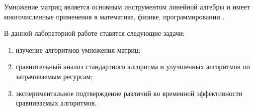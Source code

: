 \newpage
{}

Умножение матриц является основным инструментом линейной алгебры и имеет
многочисленные применения в математике, физике, программировании \cite{haskell}.

В данной лабораторной работе ставятся следующие задачи:

\begin{enumerate}
    \item изучение алгоритмов умножения матриц;
    \item сравнительный анализ стандартного алгоритма и улучшенных алгоритмов по
        затрачиваемым ресурсам;
    \item экспериментальное подтверждение различий во временной эффективности
        сравниваемых алгоритмов.
\end{enumerate}
